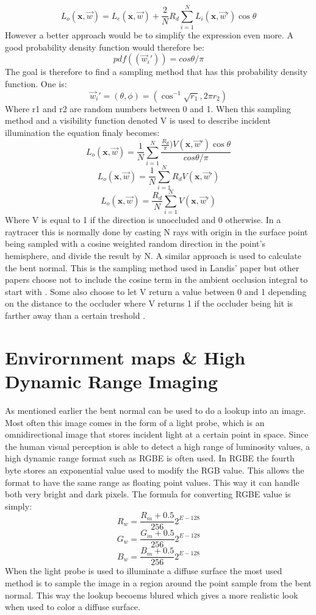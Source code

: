 \[ 
L_o(\textbf{x},\overrightarrow{w}) = 
L_e(\textbf{x},\overrightarrow{w}) + \frac{2}{N} R_d \sum_{i=1}^N L_i(\textbf{x},\overrightarrow{w}')\cos\theta
\]
However a better approach would be to simplify the expression even more. A good probability density function would therefore be\cite{Dutre2001}:
\[
pdf((\overrightarrow{w}_i')) = cos\theta / \pi
\]
The goal is therefore to find a sampling method that has this probability density function. One is\cite{Dutre2001}:
\[
\overrightarrow{w}_i' = (\theta,\phi) =
(\cos^{-1}\sqrt{r_1},2\pi r_2)
\]
Where r1 and r2 are random numbers between 0 and 1.
When this sampling method and a visibility function denoted V is used to describe incident illumination the equation finaly becomes:
\[ 
L_o(\textbf{x},\overrightarrow{w}) = 
\frac{1}{N}
\sum_{i=1}^N \frac{ 
\frac{R_d}{\pi})V(\textbf{x},\overrightarrow{w}')\cos\theta
}
{
cos\theta / \pi
}
\]
\[ 
L_o(\textbf{x},\overrightarrow{w}) = 
\frac{1}{N}
\sum_{i=1}^N
R_d V(\textbf{x},\overrightarrow{w}')
\]
\[ 
L_o(\textbf{x},\overrightarrow{w}) = 
\frac{R_d}{N} \sum_{i=1}^N V(\textbf{x},\overrightarrow{w}')
\]
Where V is equal to 1 if the direction is unoccluded and 0 otherwise. In a raytracer this is normally done by casting N rays with origin in the surface point being sampled with a cosine weighted random direction in the point's hemisphere, and divide the result by N. A similar approach is used to calculate the bent normal. This is the sampling method used in Landis' paper\cite{Landis2002} but other papers choose not to include the cosine term in the ambient occlusion integral to start with \cite{KRES2011}. Some also choose to let V return a value between 0 and 1 depending on the distance to the occluder where V returns 1 if the occluder being hit is farther away than a certain treshold \cite{McGuire:2010}. 
  
\section{Envirornment maps \& High Dynamic Range Imaging}
As mentioned earlier the bent normal can be used to do a lookup into an image. Most often this image comes in the form of a light probe, which is an omnidirectional image that stores incident light at a certain point in space. Since the human visual perception is able to detect a high range of luminosity values, a high dynamic range format such as RGBE is often used. In RGBE the fourth byte stores an exponential value used to modify the RGB value. This allows the format to have the same range as floating point values. This way it can handle both very bright and dark pixels. The formula for converting RGBE value is simply:
\[
R_w = \frac{R_m + 0.5}{256} 2^{E-128} \]\[
G_w = \frac{G_m + 0.5}{256} 2^{E-128} \]\[
B_w = \frac{B_m + 0.5}{256} 2^{E-128} \]\[
\]
When the light probe is used to illuminate a diffuse surface the most used method is to sample the image in a region around the point sample from the bent normal. This way the lookup becoems blured which gives a more realistic look when used to color a diffuse surface\cite{Landis2002}.
